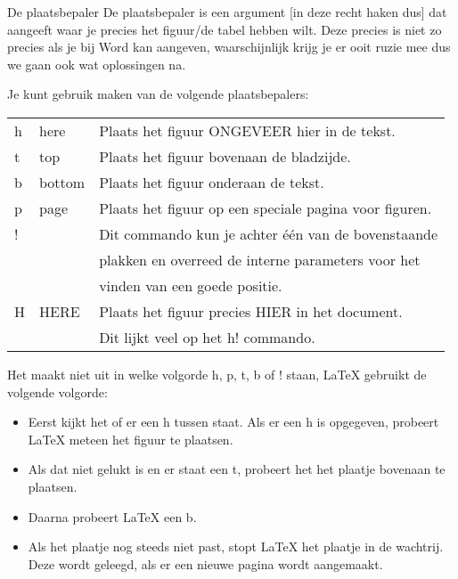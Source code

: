 \documentclass{beamer}
\begin{document}
\begin{frame}[allowframebreaks]{De plaatsbepaler}
		De plaatsbepaler is een argument [in deze recht haken dus] dat aangeeft waar je precies het figuur/de tabel hebben wilt. Deze precies is niet zo precies als je bij Word kan aangeven, waarschijnlijk krijg je er ooit ruzie mee dus we gaan ook wat oplossingen na.
	
	\framebreak
	Je kunt gebruik maken van de volgende plaatsbepalers:
	
	\begin{table}
		\center
		\begin{tabular}{lll}
			h &	here    & Plaats het figuur \alert{ONGEVEER} hier in de tekst. \\
			t & top     & Plaats het figuur bovenaan de bladzijde.\\
			b & bottom  & Plaats het figuur onderaan de tekst. \\
			p &	page    & Plaats het figuur op een speciale pagina voor figuren. \\
			! &	        & Dit commando kun je achter \'e\'en van de bovenstaande  \\ 
			&         & plakken en overreed de interne parameters voor het\\
			&         & vinden van een goede positie.\\
			H & HERE    & Plaats het figuur precies \alert{HIER} in het document.\\
			&         & Dit lijkt veel op het h! commando.
		\end{tabular}
	\end{table}
	\framebreak
	
	Het maakt niet uit in welke volgorde h, p, t, b of ! staan, \LaTeX{} gebruikt de volgende volgorde: 
	\begin{itemize}
		\item Eerst kijkt het of er een h tussen staat. Als er een h is opgegeven, probeert \LaTeX{} meteen het figuur te plaatsen.
		\item Als dat niet gelukt is en er staat een t, probeert het het plaatje bovenaan te plaatsen.
		\item Daarna probeert \LaTeX{} een b.
		\item Als het plaatje nog steeds niet past, stopt \LaTeX{} het plaatje in de wachtrij. Deze wordt geleegd, als er een nieuwe pagina wordt aangemaakt.
	\end{itemize}
	\framebreak
	

\end{frame}
\end{document}
